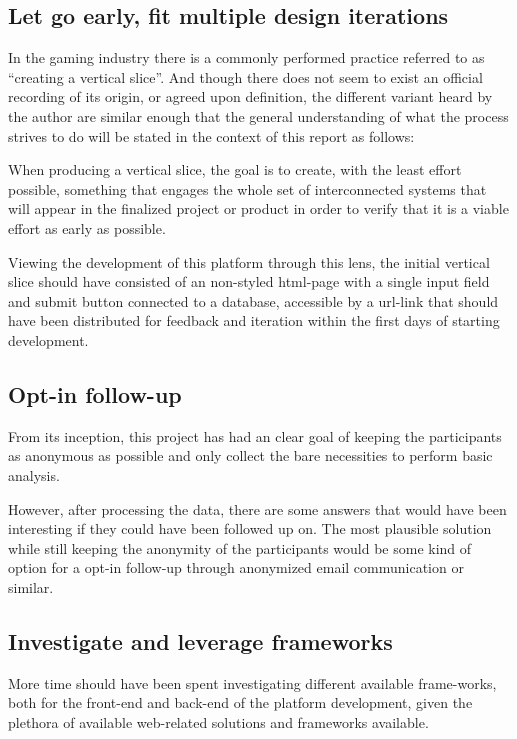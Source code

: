   \subsection{Let go early, fit multiple design iterations}

  In the gaming industry there is a commonly performed practice referred to as
  ``creating a vertical slice''. And though there does not seem to exist an
  official recording of its origin, or agreed upon definition, the different
  variant heard by the author are similar enough that the general understanding
  of what the process strives to do will be stated in the context of this
  report as follows:

  When producing a vertical slice, the goal is to create, with the least effort
  possible, something that engages the whole set of interconnected systems that
  will appear in the finalized project or product in order to verify that it is
  a viable effort as early as possible.

  Viewing the development of this platform through this lens, the initial vertical
  slice should have consisted of an non-styled html-page with a single input
  field and submit button connected to a database, accessible by a url-link
  that should have been distributed for feedback and iteration within the first
  days of starting development.

  \subsection{Opt-in follow-up}

  From its inception, this project has had an clear goal of keeping the
  participants as anonymous as possible and only collect the bare necessities
  to perform basic analysis.

  However, after processing the data, there are some answers that would have
  been interesting if they could have been followed up on. The most plausible
  solution while still keeping the anonymity of the participants would be some
  kind of option for a opt-in follow-up through anonymized email communication
  or similar.

  \subsection{Investigate and leverage frameworks}

  More time should have been spent investigating different available
  frame-works, both for the front-end and back-end of the platform development,
  given the plethora of available web-related solutions and frameworks available.


